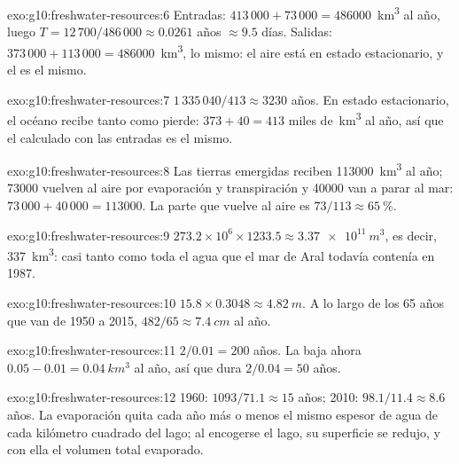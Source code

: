 \begin{solution}{exo:g10:freshwater-resources:6}
Entradas: $413\,000 + 73\,000 = \num{486000}$~\unit{km^3} al año, luego
$T = 12\,700/486\,000 \approx \num{0.0261}$ años $\approx \num{9.5}$ días.
Salidas: $373\,000 + 113\,000 = \num{486000}$~\unit{km^3}, lo mismo: el aire
está en estado estacionario, y el  es el mismo.
\end{solution}

\begin{solution}{exo:g10:freshwater-resources:7}
$1\,335\,040/413 \approx \num{3230}$ años. En estado estacionario, el océano
recibe tanto como pierde: $373 + 40 = 413$ miles de~\unit{km^3} al año, así
que el  calculado con las entradas es el mismo.
\end{solution}

\begin{solution}{exo:g10:freshwater-resources:8}
Las tierras emergidas reciben \num{113000}~\unit{km^3} al año; \num{73000}
vuelven al aire por evaporación y transpiración y \num{40000} van a parar al
mar: $73\,000 + 40\,000 = \num{113000}$. La parte que vuelve al aire es
$73/113 \approx \qty{65}{\percent}$.
\end{solution}

\begin{solution}{exo:g10:freshwater-resources:9}
$273.2 \times 10^6 \times 1233.5 \approx \qty{3.37e11}{m^3}$, es decir,
\qty{337}{km^3}: casi tanto como toda el agua que el mar de Aral todavía
contenía en 1987.
\end{solution}

\begin{solution}{exo:g10:freshwater-resources:10}
$15.8 \times 0.3048 \approx \qty{4.82}{m}$. A lo largo de los 65 años que van
de 1950 a 2015, $482/65 \approx \qty{7.4}{cm}$ al año.
\end{solution}

\begin{solution}{exo:g10:freshwater-resources:11}
$2/0.01 = 200$ años. La  baja ahora $0.05 - 0.01 =
\qty{0.04}{km^3}$ al año, así que dura $2/0.04 = 50$ años.
\end{solution}

\begin{solution}{exo:g10:freshwater-resources:12}
1960: $1093/71.1 \approx 15$ años; 2010: $98.1/11.4 \approx 8.6$ años. La
evaporación quita cada año más o menos el mismo espesor de agua de cada
kilómetro cuadrado del lago; al encogerse el lago, su superficie se redujo, y
con ella el volumen total evaporado.
\end{solution}


